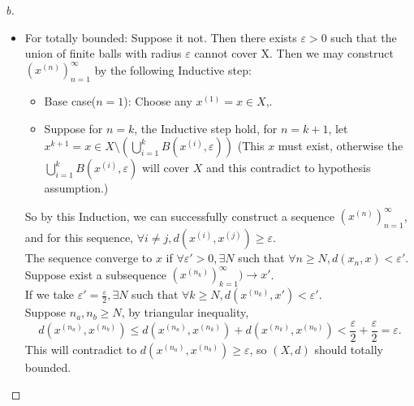 \begin{proof}[b]
\begin{itemize}
        \item For totally bounded: Suppose it not. Then there exists $\varepsilon > 0$ such that the union of finite balls with radius $\varepsilon$ cannot cover X.
        Then we may construct $(x^{(n)})_{n=1}^{\infty}$ by the following Inductive step:
        \begin{itemize}
            \item Base case($n = 1$): Choose any $x^{(1)} = x \in X$,.
            \item Suppose for $n = k$, the Inductive step hold, for $n = k + 1$, let $x^{k+1} = x \in X \setminus (\bigcup_{i=1}^{k} B(x^{(i)}, \varepsilon))$ (This $x$ must exist, otherwise the $\bigcup_{i=1}^{k} B(x^{(i)}, \varepsilon)$ will cover $X$ and this contradict to hypothesis assumption.) 
        \end{itemize}
        So by this Induction, we can successfully construct a sequence $(x^{(n)})_{n=1}^{\infty}$, and for this sequence, $\forall i \neq j, d(x^{(i)}, x^{(j)}) \geq \varepsilon$. \\
        The sequence converge to $x$ if $\forall \varepsilon' > 0, \exists N$ such that $\forall n \geq N, d(x_n, x) < \varepsilon'$. \\
        Suppose exist a subsequence $(x^{(n_k)})_{k=1}^{\infty}) \to x'$. \\
        If we take $\varepsilon' = \frac{\varepsilon}{2}, \exists N$ such that $\forall k \geq N, d(x^{(n_k)}, x') < \varepsilon'$. \\
        Suppose $n_a, n_b \geq N$, by triangular inequality,
        \[
            d(x^{(n_a)}, x^{(n_b)}) \leq d(x^{(n_a)}, x^{(n_k)}) + d(x^{(n_k)}, x^{(n_b)}) < \frac{\varepsilon}{2} + \frac{\varepsilon}{2} = \varepsilon.
        \]
        This will contradict to $d(x^{(n_a)}, x^{(n_b)}) \geq \varepsilon$, so $(X,d)$ should totally bounded.
    \end{itemize}
\end{proof}
